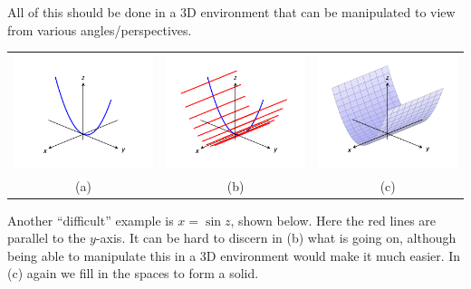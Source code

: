 \documentclass[10pt]{article}
\begin{document}
All of this should be done in a 3D environment that can be manipulated to view from various angles/perspectives. 

\begin{tabular}{ccc}
\includegraphics[scale=1.25,trim=5mm 5mm 5mm 5mm,clip=true]{figures/figspace4a} &\includegraphics[scale=1.25,trim=5mm 5mm 5mm 5mm,clip=true]{figures/figspace4b} &\includegraphics[scale=1.25,trim=3mm 5mm 3mm 2mm,clip=true]{figures/figspace4c}\\[-10pt]
(a) & (b) & (c)
\end{tabular}

Another ``difficult'' example is $x=\sin z$, shown below. Here the red lines are parallel to the $y$-axis. It can be hard to discern in (b) what is going on, although being able to manipulate this in a 3D environment would make it much easier. In (c) again we fill in the spaces to form a solid.
\end{document}
